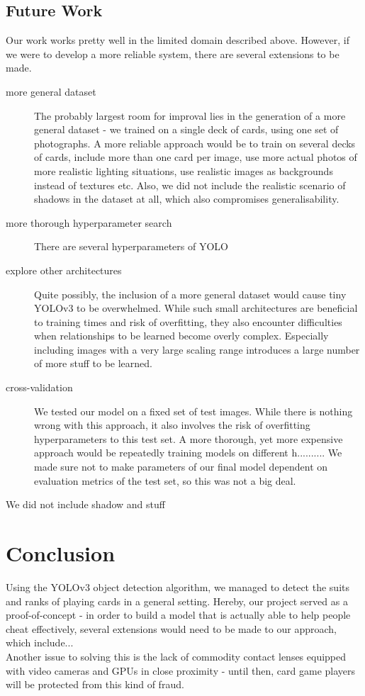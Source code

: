\documentclass[a4paper]{article}
\begin{document}
\subsection{Future Work}
Our work works pretty well in the limited domain described above. However, if we were to develop a more reliable system, there are several extensions to be made.
\begin{description}
\item[more general dataset] The probably largest room for improval lies in the generation of a more general dataset - we trained on a single deck of cards, using one set of photographs. A more reliable approach would be to train on several decks of cards, include more than one card per image, use more actual photos of more realistic lighting situations, use realistic images as backgrounds instead of textures etc.
Also, we did not include the realistic scenario of shadows in the dataset at all, which also compromises generalisability.
\item[more thorough hyperparameter search] There are several hyperparameters of YOLO

\item[explore other architectures] Quite possibly, the inclusion of a more general dataset would cause tiny YOLOv3 to be overwhelmed. While such small architectures are beneficial to training times and risk of overfitting, they also encounter difficulties when relationships to be learned become overly complex. Especially including images with a very large scaling range introduces a large number of more stuff to be learned.
\item[cross-validation] We tested our model on a fixed set of test images. While there is nothing wrong with this approach, it also involves the risk of overfitting hyperparameters to this test set. A more thorough, yet more expensive approach would be repeatedly training models on different h.......... We made sure not to make parameters of our final model dependent on evaluation metrics of the test set, so this was not a big deal.
\end{description}
We did not include shadow and stuff
\section{Conclusion}
Using the YOLOv3 object detection algorithm, we managed to detect the suits and ranks of playing cards in a general setting. Hereby, our project served as a proof-of-concept - in order to build a model that is actually able to help people cheat effectively, several extensions would need to be made to our approach, which include... \\ Another issue to solving this is the lack of commodity contact lenses equipped with video cameras and GPUs in close proximity - until then, card game players will be protected from this kind of fraud.
\end{document}

